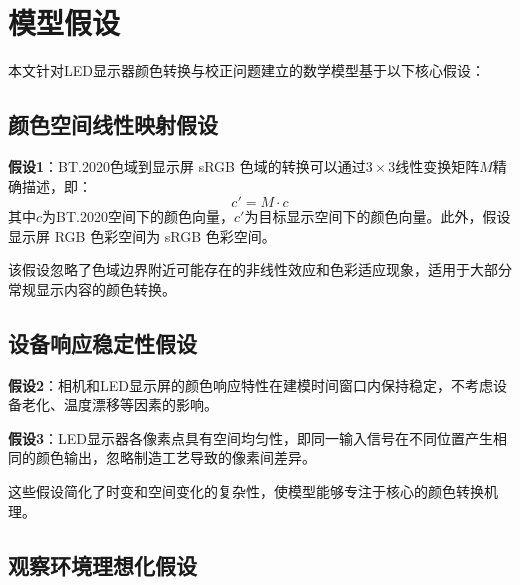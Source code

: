 \chapter[\hspace{0pt}模型假设]{{\heiti{}\hspace{0pt}模型假设}}\label{chapter2:模型假设}

\removelofgap
\removelotgap

本文针对LED显示器颜色转换与校正问题建立的数学模型基于以下核心假设：

\section[\hspace{-2pt}颜色空间线性映射假设]{{\heiti{} \hspace{-8pt}颜色空间线性映射假设}}\label{section2: 颜色空间线性映射假设}

\textbf{假设1}：BT.2020色域到显示屏 sRGB 色域的转换可以通过$3\times 3$线性变换矩阵$M$精确描述，即：
$$c' = M \cdot c$$
其中$c$为BT.2020空间下的颜色向量，$c'$为目标显示空间下的颜色向量。此外，假设显示屏 RGB 色彩空间为 sRGB 色彩空间。

该假设忽略了色域边界附近可能存在的非线性效应和色彩适应现象，适用于大部分常规显示内容的颜色转换。

\section[\hspace{-2pt}设备响应稳定性假设]{{\heiti{} \hspace{-8pt}设备响应稳定性假设}}\label{section2: 设备响应稳定性假设}

\textbf{假设2}：相机和LED显示屏的颜色响应特性在建模时间窗口内保持稳定，不考虑设备老化、温度漂移等因素的影响。

\textbf{假设3}：LED显示器各像素点具有空间均匀性，即同一输入信号在不同位置产生相同的颜色输出，忽略制造工艺导致的像素间差异。

这些假设简化了时变和空间变化的复杂性，使模型能够专注于核心的颜色转换机理。

\section[\hspace{-2pt}观察环境理想化假设]{{\heiti{} \hspace{-8pt}观察环境理想化假设}}\label{section2: 观察环境理想化假设}

